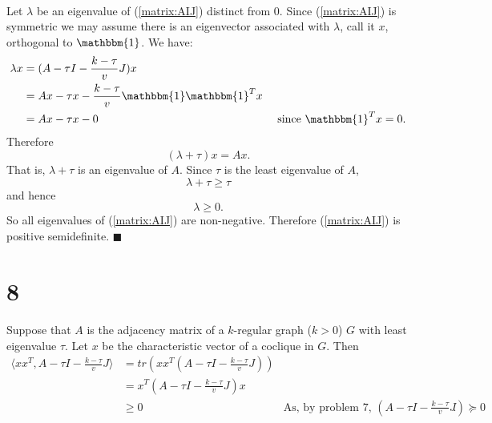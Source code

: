 \documentclass[letterpaper,12pt,oneside,onecolumn]{article}
\newcommand{\1}{\mathbbm{1}}
\begin{document}
\paragraph{}
Let $\lambda$ be an eigenvalue of (\ref{matrix:AIJ}) distinct from $0$. Since (\ref{matrix:AIJ}) is symmetric we may assume there is an eigenvector associated with $\lambda$, call it $x$, orthogonal to $\1$. We have:
\begin{align*}
\lambda x &= (A - \tau I - \frac{k - \tau}{v} J)x \\
&= Ax - \tau x - \frac{k-\tau}{v} \1\1^T x \\
&= Ax - \tau x - 0 &\text{ since $\1^T x = 0$}. \\
\end{align*}
Therefore
$$(\lambda+\tau)x = A x. $$
That is, $\lambda + \tau$ is an eigenvalue of $A$. Since $\tau$ is the least eigenvalue of $A$, 
$$\lambda + \tau \geq \tau$$
and hence
$$\lambda \geq 0.$$
So all eigenvalues of (\ref{matrix:AIJ}) are non-negative. Therefore (\ref{matrix:AIJ}) is positive semidefinite. $\blacksquare$
\section*{8}
\paragraph{}
Suppose that $A$ is the adjacency matrix of a $k$-regular graph ($k > 0$) $G$ with least eigenvalue $\tau$. Let $x$ be the characteristic vector of a coclique in $G$. Then
\begin{align*}
\langle xx^T, A - \tau I - \frac{k - \tau}{v} J \rangle &= tr(xx^T(A - \tau I - \frac{k - \tau}{v} J)) \\
&= x^T(A - \tau I - \frac{k - \tau}{v} J)x \\
&\geq 0 &\text{As, by problem $7$, $(A - \tau I - \frac{k - \tau}{v} J) \succcurlyeq 0$}.
\end{align*}
\end{document}
